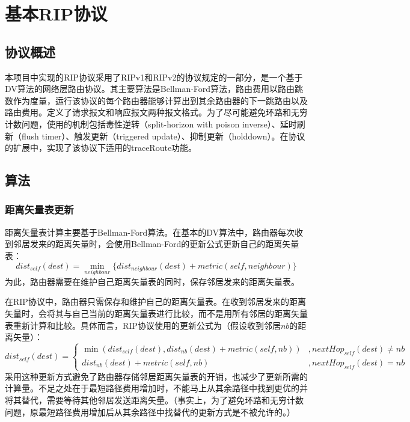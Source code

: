\section{基本RIP协议} %
\label{sec:rip}
	\subsection{协议概述} %
	\label{sub:协议概述}
		本项目中实现的RIP协议采用了RIPv1和RIPv2的协议规定的一部分，是一个基于DV算法的网络层路由协议。其主要算法是Bellman-Ford算法，路由费用以路由跳数作为度量，运行该协议的每个路由器能够计算出到其余路由器的下一跳路由以及路由费用。定义了请求报文和响应报文两种报文格式。为了尽可能避免环路和无穷计数问题，使用的机制包括毒性逆转（split-horizon with poison inverse）、延时刷新（flush timer）、触发更新（triggered update）、抑制更新（holddown）。在协议的扩展中，实现了该协议下适用的traceRoute功能。
	\subsection{算法} %
	\label{sub:算法}
		\subsubsection{距离矢量表更新}
		\label{ssub:距离矢量表更新}
			距离矢量表计算主要基于Bellman-Ford算法。在基本的DV算法中，路由器每次收到邻居发来的距离矢量时，会使用Bellman-Ford的更新公式更新自己的距离矢量表：$$ dist_{self}(dest) = \min_{neighbour}\{dist_{neighbour}(dest) + metric(self,neighbour)\} $$ 为此，路由器需要在维护自己距离矢量表的同时，保存邻居发来的距离矢量表。
			\par 在RIP协议中，路由器只需保存和维护自己的距离矢量表。在收到邻居发来的距离矢量时，会将其与自己当前的距离矢量表进行比较，而不是用所有邻居的距离矢量表重新计算和比较。具体而言，RIP协议使用的更新公式为（假设收到邻居$nb$的距离矢量）：$$ dist_{self}(dest) = \begin{cases} \min( dist_{self}(dest), dist_{nb}(dest) + metric(self,nb) ) & , nextHop_{self}(dest) \neq nb \\ dist_{nb}(dest) + metric(self,nb) & , nextHop_{self}(dest) = nb \end{cases}$$ 采用这种更新方式避免了路由器存储邻居距离矢量表的开销，也减少了更新所需的计算量。不足之处在于最短路径费用增加时，不能马上从其余路径中找到更优的并将其替代，需要等待其他邻居发送距离矢量。（事实上，为了避免环路和无穷计数问题，原最短路径费用增加后从其余路径中找替代的更新方式是不被允许的。）
